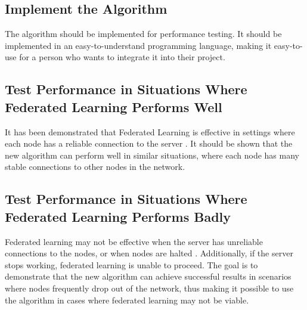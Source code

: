 \subsection{Implement the Algorithm}
The algorithm should be implemented for performance testing. It should be implemented in an easy-to-understand programming language, making it easy-to-use for a person who wants to integrate it into their project.

\subsection{Test Performance in Situations Where Federated Learning Performs Well}
It has been demonstrated that Federated Learning is effective in settings where each node has a reliable connection to the server \citeme. It should be shown that the new algorithm can perform well in similar situations, where each node has many stable connections to other nodes in the network.

\subsection{Test Performance in Situations Where Federated Learning Performs Badly}
Federated learning may not be effective when the server has unreliable connections to the nodes, or when nodes are halted \citeme. Additionally, if the server stops working, federated learning is unable to proceed. The goal is to demonstrate that the new algorithm can achieve successful results in scenarios where nodes frequently drop out of the network, thus making it possible to use the algorithm in cases where federated learning may not be viable.
